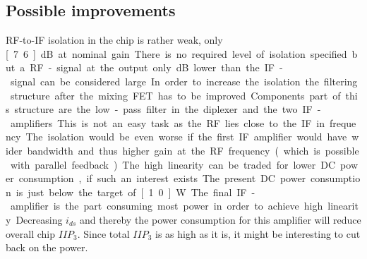 		\subsection{Possible improvements}
			RF-to-IF isolation in the chip is rather weak, only \unit[7.6]{dB} at nominal gain. There is no required level of isolation specified but a RF-signal at the output only \unit[18]{dB} lower than the IF-signal can be considered large. In order to increase the isolation the filtering structure after the mixing FET has to be improved. Components part of this structure are the low-pass filter in the diplexer and the two IF-amplifiers. This is not an easy task as the RF lies close to the IF in frequency. The isolation would be even worse if the first IF amplifier would have wider bandwidth and thus higher gain at the RF frequency (which is possible with parallel feedback).

			The high linearity can be traded for lower DC power consumption, if such an interest exists. The present DC power consumption is just below the target of \unit[1.0]{W}. The final IF-amplifier is the part consuming most power in order to achieve high linearity. Decreasing $i_{ds}$ and thereby the power consumption for this amplifier will reduce overall chip $IIP_3$. Since total $IIP_3$ is as high as it is, it might be interesting to cut back on the power.
